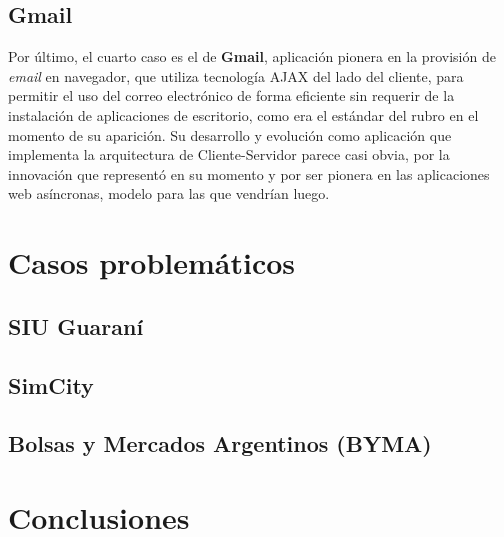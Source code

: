 \documentclass[11pt]{article}
\begin{document}
\subsection{Gmail}

Por último, el cuarto caso es el de \textbf{Gmail}, aplicación pionera en la 
provisión de \emph{email} en navegador, que utiliza tecnología AJAX del lado del 
cliente, para permitir el uso del correo electrónico de forma eficiente sin 
requerir de la instalación de aplicaciones de escritorio, como era el estándar 
del rubro en el momento de su aparición. Su desarrollo y evolución como 
aplicación que implementa la arquitectura de Cliente-Servidor parece casi obvia,
por la innovación que representó en su momento y por ser pionera en las
aplicaciones web asíncronas, modelo para las que vendrían luego.

\section{Casos problemáticos}

\subsection{SIU Guaraní}

\subsection{SimCity}

\subsection{Bolsas y Mercados Argentinos (BYMA)}

\section{Conclusiones}

\end{document}
